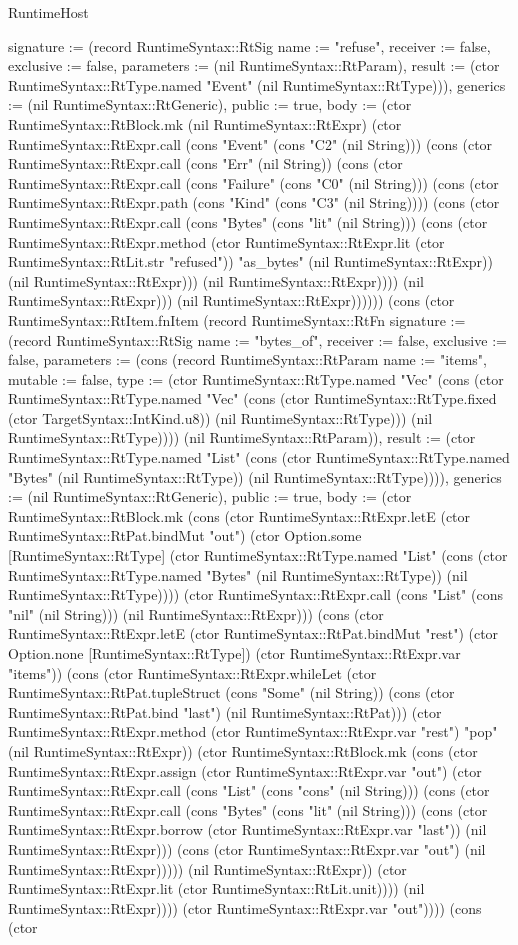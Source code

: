 \begin{lexlean}{RuntimeHost}
\begin{semanticmodule}
{{signature := (record RuntimeSyntax::RtSig {name := "refuse", receiver := false, exclusive := false, parameters := (nil RuntimeSyntax::RtParam), result := (ctor RuntimeSyntax::RtType.named "Event" (nil RuntimeSyntax::RtType))}), generics := (nil RuntimeSyntax::RtGeneric), public := true, body := (ctor RuntimeSyntax::RtBlock.mk (nil RuntimeSyntax::RtExpr) (ctor RuntimeSyntax::RtExpr.call (cons "Event" (cons "C2" (nil String))) (cons (ctor RuntimeSyntax::RtExpr.call (cons "Err" (nil String)) (cons (ctor RuntimeSyntax::RtExpr.call (cons "Failure" (cons "C0" (nil String))) (cons (ctor RuntimeSyntax::RtExpr.path (cons "Kind" (cons "C3" (nil String)))) (cons (ctor RuntimeSyntax::RtExpr.call (cons "Bytes" (cons "lit" (nil String))) (cons (ctor RuntimeSyntax::RtExpr.method (ctor RuntimeSyntax::RtExpr.lit (ctor RuntimeSyntax::RtLit.str "refused")) "as_bytes" (nil RuntimeSyntax::RtExpr)) (nil RuntimeSyntax::RtExpr))) (nil RuntimeSyntax::RtExpr)))) (nil RuntimeSyntax::RtExpr))) (nil RuntimeSyntax::RtExpr))))})) (cons (ctor RuntimeSyntax::RtItem.fnItem (record RuntimeSyntax::RtFn {signature := (record RuntimeSyntax::RtSig {name := "bytes_of", receiver := false, exclusive := false, parameters := (cons (record RuntimeSyntax::RtParam {name := "items", mutable := false, type := (ctor RuntimeSyntax::RtType.named "Vec" (cons (ctor RuntimeSyntax::RtType.named "Vec" (cons (ctor RuntimeSyntax::RtType.fixed (ctor TargetSyntax::IntKind.u8)) (nil RuntimeSyntax::RtType))) (nil RuntimeSyntax::RtType)))}) (nil RuntimeSyntax::RtParam)), result := (ctor RuntimeSyntax::RtType.named "List" (cons (ctor RuntimeSyntax::RtType.named "Bytes" (nil RuntimeSyntax::RtType)) (nil RuntimeSyntax::RtType)))}), generics := (nil RuntimeSyntax::RtGeneric), public := true, body := (ctor RuntimeSyntax::RtBlock.mk (cons (ctor RuntimeSyntax::RtExpr.letE (ctor RuntimeSyntax::RtPat.bindMut "out") (ctor Option.some [RuntimeSyntax::RtType] (ctor RuntimeSyntax::RtType.named "List" (cons (ctor RuntimeSyntax::RtType.named "Bytes" (nil RuntimeSyntax::RtType)) (nil RuntimeSyntax::RtType)))) (ctor RuntimeSyntax::RtExpr.call (cons "List" (cons "nil" (nil String))) (nil RuntimeSyntax::RtExpr))) (cons (ctor RuntimeSyntax::RtExpr.letE (ctor RuntimeSyntax::RtPat.bindMut "rest") (ctor Option.none [RuntimeSyntax::RtType]) (ctor RuntimeSyntax::RtExpr.var "items")) (cons (ctor RuntimeSyntax::RtExpr.whileLet (ctor RuntimeSyntax::RtPat.tupleStruct (cons "Some" (nil String)) (cons (ctor RuntimeSyntax::RtPat.bind "last") (nil RuntimeSyntax::RtPat))) (ctor RuntimeSyntax::RtExpr.method (ctor RuntimeSyntax::RtExpr.var "rest") "pop" (nil RuntimeSyntax::RtExpr)) (ctor RuntimeSyntax::RtBlock.mk (cons (ctor RuntimeSyntax::RtExpr.assign (ctor RuntimeSyntax::RtExpr.var "out") (ctor RuntimeSyntax::RtExpr.call (cons "List" (cons "cons" (nil String))) (cons (ctor RuntimeSyntax::RtExpr.call (cons "Bytes" (cons "lit" (nil String))) (cons (ctor RuntimeSyntax::RtExpr.borrow (ctor RuntimeSyntax::RtExpr.var "last")) (nil RuntimeSyntax::RtExpr))) (cons (ctor RuntimeSyntax::RtExpr.var "out") (nil RuntimeSyntax::RtExpr))))) (nil RuntimeSyntax::RtExpr)) (ctor RuntimeSyntax::RtExpr.lit (ctor RuntimeSyntax::RtLit.unit)))) (nil RuntimeSyntax::RtExpr)))) (ctor RuntimeSyntax::RtExpr.var "out"))})) (cons (ctor }
\end{semanticmodule}
\end{lexlean}
